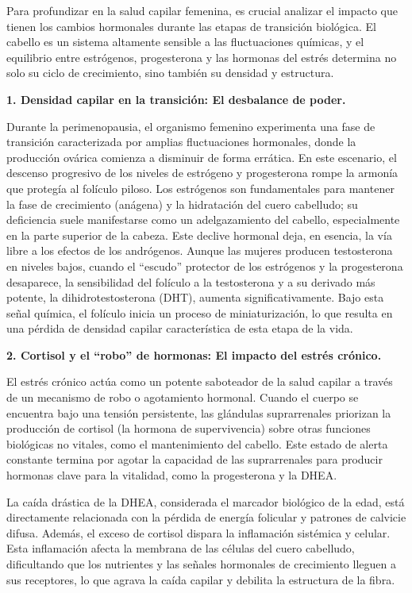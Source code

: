\documentclass[
  spanish,
]{article}
\begin{document}
Para profundizar en la salud capilar femenina, es crucial analizar el impacto que tienen los cambios hormonales durante las etapas de transición biológica. El cabello es un sistema altamente sensible a las fluctuaciones químicas, y el equilibrio entre estrógenos, progesterona y las hormonas del estrés determina no solo su ciclo de crecimiento, sino también su densidad y estructura.

\textbf{1. Densidad capilar en la transición: El desbalance de poder.}

Durante la perimenopausia, el organismo femenino experimenta una fase de transición caracterizada por amplias fluctuaciones hormonales, donde la producción ovárica comienza a disminuir de forma errática. En este escenario, el descenso progresivo de los niveles de estrógeno y progesterona rompe la armonía que protegía al folículo piloso. Los estrógenos son fundamentales para mantener la fase de crecimiento (anágena) y la hidratación del cuero cabelludo; su deficiencia suele manifestarse como un adelgazamiento del cabello, especialmente en la parte superior de la cabeza.
Este declive hormonal deja, en esencia, la vía libre a los efectos de los andrógenos. Aunque las mujeres producen testosterona en niveles bajos, cuando el ``escudo'' protector de los estrógenos y la progesterona desaparece, la sensibilidad del folículo a la testosterona y a su derivado más potente, la dihidrotestosterona (DHT), aumenta significativamente. Bajo esta señal química, el folículo inicia un proceso de miniaturización, lo que resulta en una pérdida de densidad capilar característica de esta etapa de la vida.

\textbf{2. Cortisol y el ``robo'' de hormonas: El impacto del estrés crónico.}

El estrés crónico actúa como un potente saboteador de la salud capilar a través de un mecanismo de robo o agotamiento hormonal. Cuando el cuerpo se encuentra bajo una tensión persistente, las glándulas suprarrenales priorizan la producción de cortisol (la hormona de supervivencia) sobre otras funciones biológicas no vitales, como el mantenimiento del cabello. Este estado de alerta constante termina por agotar la capacidad de las suprarrenales para producir hormonas clave para la vitalidad, como la progesterona y la DHEA.

La caída drástica de la DHEA, considerada el marcador biológico de la edad, está directamente relacionada con la pérdida de energía folicular y patrones de calvicie difusa. Además, el exceso de cortisol dispara la inflamación sistémica y celular. Esta inflamación afecta la membrana de las células del cuero cabelludo, dificultando que los nutrientes y las señales hormonales de crecimiento lleguen a sus receptores, lo que agrava la caída capilar y debilita la estructura de la fibra.
\end{document}
